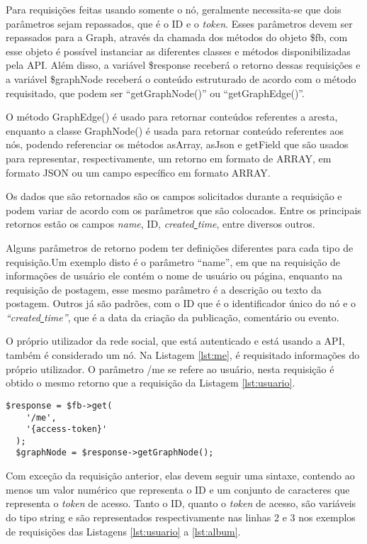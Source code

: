 Para requisições feitas usando somente o nó, geralmente necessita-se que dois parâmetros sejam repassados, que é o ID e o \textit{token}. Esses parâmetros devem ser repassados para a Graph, através da chamada dos métodos do objeto \$fb, com esse objeto é possível instanciar as diferentes classes e métodos disponibilizadas pela API. Além disso, a variável \$response receberá o retorno dessas requisições e a variável \$graphNode receberá o conteúdo estruturado de acordo com o método requisitado, que podem ser ``getGraphNode()'' ou ``getGraphEdge()''.

O método GraphEdge() é usado para retornar conteúdos referentes a aresta, enquanto a classe GraphNode() é usada para retornar conteúdo referentes aos nós, podendo referenciar os métodos asArray, asJson e getField que são usados para representar, respectivamente, um retorno em formato de ARRAY, em formato JSON ou um campo específico em formato ARRAY.

Os dados que são retornados são os campos solicitados durante a requisição e podem variar de acordo com os parâmetros que são colocados. Entre os principais retornos estão os campos \textit{name}, ID, \textit{created\underline{{ }}time}, entre diversos outros. 

Alguns parâmetros de retorno podem ter definições diferentes para cada tipo de requisição.Um exemplo disto é o parâmetro ``name'', em que na requisição de informações de usuário ele contém o nome de usuário ou página, enquanto na requisição de postagem, esse mesmo parâmetro é a descrição ou texto da postagem. Outros já são padrões, com o ID que é o identificador único do nó e o \textit{``created\underline{{ }}time''}, que é a data da criação da publicação, comentário ou evento.

O próprio utilizador da rede social, que está autenticado e está usando a API, também é considerado um nó. Na Listagem \ref{lst:me}, é requisitado informações do próprio utilizador. O parâmetro /me se refere ao usuário, nesta requisição é obtido o mesmo retorno que a requisição da Listagem \ref{lst:usuario}.

\begin{lstlisting}[caption={Requisitar informações do próprio usuário},label={lst:me}]
  $response = $fb->get(
    '/me',
    '{access-token}'
  );
  $graphNode = $response->getGraphNode();
\end{lstlisting}

Com exceção da requisição anterior, elas devem seguir uma sintaxe, contendo ao menos um valor numérico que representa o ID e um conjunto de caracteres que representa o \textit{token} de acesso. Tanto o ID, quanto o \textit{token} de acesso, são variáveis do tipo string e são representados respectivamente nas linhas 2 e 3 nos exemplos de requisições das Listagens \ref{lst:usuario} a \ref{lst:album}.

